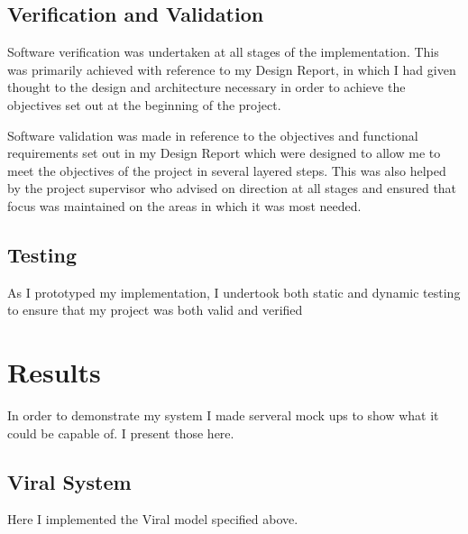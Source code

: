 \documentclass[12pt,a4paper]{article}
\begin{document}
\subsection{Verification and Validation}

Software verification was undertaken at all stages of the implementation. This was primarily achieved with reference to my Design Report, in which I had given thought to the design and architecture necessary in order to achieve the objectives set out at the beginning of the project.

Software validation was made in reference to the objectives and functional requirements set out in my Design Report which were designed to allow me to meet the objectives of the project in several layered steps. This was also helped by the project supervisor who advised on direction at all stages and ensured that focus was maintained on the areas in which it was most needed.

\subsection{Testing}

As I prototyped my implementation, I undertook both static and dynamic testing to ensure that my project was both valid and verified 

\section{Results}

In order to demonstrate my system I made serveral mock ups to show what it could be capable of. I present those here.

\subsection{Viral System}

Here I implemented the Viral model specified above.
\end{document}
